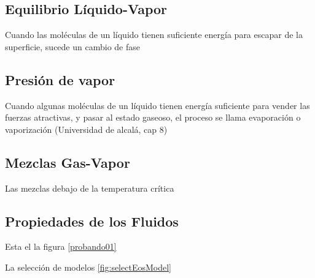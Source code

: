 


\subsection{Equilibrio Líquido-Vapor}

    Cuando las moléculas de un líquido tienen suficiente energía para escapar de la superficie, sucede un cambio de fase

\subsection{Presión de vapor}
    Cuando algunas moléculas de un líquido tienen energía suficiente para vender las fuerzas atractivas, y pasar al estado gaseoso, el proceso se llama evaporación o vaporización (Universidad de alcalá, cap 8)


\subsection{Mezclas Gas-Vapor}
Las mezclas debajo de la temperatura crítica


\subsection{Propiedades de los Fluidos}


  Esta el la figura \ref{probando01}

  La selección de modelos \ref{fig:selectEosModel} \parencite{bib:DimianBildea2014}


